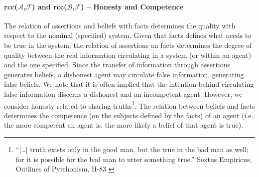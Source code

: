 \documentclass[conference]{IEEEtran}
\newcommand{\assertionRegion}{\mathcal{A}}
\newcommand{\beliefRegion}{\mathcal{B}}
\newcommand{\factRegion}{\mathcal{F}}
\newcommand{\Rcc}[2]{rcc(#1,#2)}
\begin{document}
\paragraph{\Rcc{$\assertionRegion$}{$\factRegion$} and
\Rcc{$\beliefRegion$}{$\factRegion$} -- Honesty and Competence} 
The relation of assertions
and beliefs with facts determines the quality with respect to the nominal
(specified) system.  Given that facts defines what needs to be true in the system,
the relation of assertions an facts determines the degree of quality between
the real information circulating in a system (or within an agent) and
the one specified.  Since the transfer of information
through assertions generates beliefs, a dishonest agent may circulate false
information, generating false beliefs.  We note that it is often implied that
the intention behind circulating false information discerns a dishonest and an
incompetent agent. However, we consider honesty related to sharing
truths\footnote{``[\ldots] truth exists only in the good man, but the true in
the bad man as well; for it is possible for the bad man to utter something
true.'' Sextus Empiricus, Outlines of Pyrrhonism,
II-83 \autocite{Empiricus1990Pyrrhonism}}.  The relation between beliefs and
facts determines the competence (on the subjects defined by the facts) of an
agent (i.e. the more competent an agent is, the more likely a belief of that
agent is true).
\end{document}
